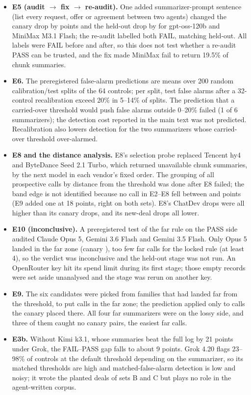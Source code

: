\documentclass[11pt]{article}
\begin{document}
\begin{itemize}
\item \textbf{E5 (audit $\to$ fix $\to$ re-audit).} One added summarizer-prompt sentence (list every request, offer or agreement between two agents) changed the canary drop by  points and the held-out drop by  for gpt-oss-120b and MiniMax M3.1 Flash; the re-audit labelled both FAIL, matching held-out. All labels were FAIL before and after, so this does not test whether a re-audit PASS can be trusted, and the fix made MiniMax fail to return 19.5\% of chunk summaries.
\item \textbf{E6.} The preregistered false-alarm predictions are means over 200 random calibration/test splits of the 64 controls; per split, test false alarms after a 32-control recalibration exceed 20\% in 5--14\% of splits. The prediction that a carried-over threshold would push false alarms outside 0--20\% failed (1 of 6 summarizers); the detection cost reported in the main text was not predicted. Recalibration also lowers detection for the two summarizers whose carried-over threshold over-alarmed.
\item \textbf{E8 and the distance analysis.} E8's selection probe replaced Tencent hy4 and ByteDance Seed 2.1 Turbo, which returned unavailable chunk summaries, by the next model in each vendor's fixed order. The grouping of all prospective calls by distance from the threshold was done after E8 failed; the band edge is not identified because no call in E2--E8 fell between  and  points (E9 added one at 18 points, right on both sets). E8's ChatDev drops were all higher than its canary drops, and its new-deal drops all lower.
\item \textbf{E10 (inconclusive).} A preregistered test of the far rule on the PASS side audited Claude Opus 5, Gemini 3.6 Flash and Gemini 3.5 Flash. Only Opus 5 landed in the far zone (canary ), too few far calls for the locked rule (at least 4), so the verdict was inconclusive and the held-out stage was not run. An OpenRouter key hit its spend limit during its first stage; those empty records were set aside unanalysed and the stage was rerun on another key.
\item \textbf{E9.} The six candidates were picked from families that had landed far from the threshold, to put calls in the far zone; the prediction applied only to calls the canary placed there. All four far summarizers were on the lossy side, and three of them caught no canary pairs, the easiest far calls.
\item \textbf{E3b.} Without Kimi k3.1, whose summaries beat the full log by 21 points under Grok, the FAIL--PASS gap falls to about 9 points. Grok 4.20 flags 23--98\% of controls at the default threshold depending on the summarizer, so its matched thresholds are high and matched-false-alarm detection is low and noisy; it wrote the planted deals of sets B and C but plays no role in the agent-written corpus.

\end{itemize}
\end{document}
